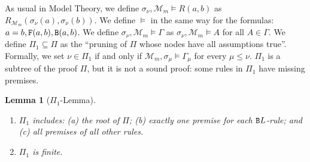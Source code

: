 \documentclass[a4paper,12pt]{article}
\newtheorem{lemma}[theorem]{Lemma}
\newcommand{\setM}              { {\mathcal M} }
\newcommand{\Backward}         { {\tt B} }
\newcommand{\Forward}         { {\tt F} }
\begin{document}
As usual in Model Theory, we define $\sigma_\nu, \setM_m \models R(a,b)$ as $R_{\setM_m}(\sigma_\nu(a), \sigma_\nu(b))$. We define $\models$ in the same way for the formulas: $a=b, \Forward(a,b), \Backward(a,b)$. We define $\sigma_\nu, \setM_m \models \Gamma$ as $\sigma_\nu, \setM_m \models A$ for all $A \in \Gamma$. We define $\Pi_1 \subseteq \Pi$ as the ``pruning of $ \Pi$ whose nodes have all assumptions true''. Formally, we set $\nu \in \Pi_1$ if and only if $\setM_m, \sigma_\mu \models \Gamma_\mu$ for every $\mu \le \nu$. $\Pi_1$ is a subtree of the proof $\Pi$, but it is not a sound proof: some rules in $\Pi_1$ have missing premises.


\begin{lemma}[$\Pi_1$-Lemma]
\label{lemma-pi-1}
\begin{enumerate}
\item
$\Pi_1$ includes: \emph{(a)} the root of $\Pi$; \emph{(b)} exactly one premise for each $\Backward L$-rule; and \emph{(c)} all premises of all other rules. 
\item
$\Pi_1$ is finite.
\end{enumerate}
\end{lemma}
\end{document}
